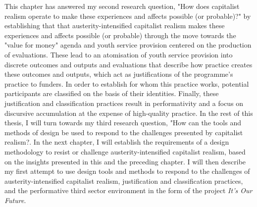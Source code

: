 This chapter has answered my second research question, "How does capitalist realism operate to make these experiences and affects possible (or probable)?" by establishing that that austerity-intensified capitalist realism makes these experiences and affects possible (or probable) through the move towards the "value for money" agenda and youth service provision centered on the production of evaluations. These lead to an atomisation of youth service provision into discrete outcomes and outputs and evaluations that describe how practice creates these outcomes and outputs, which act as justifications of the programme's practice to funders. In order to establish for whom this practice works, potential participants are classified on the basis of their identities. Finally, these justification and classification practices result in performativity and a focus on discursive accumulation at the expense of high-quality practice. In the rest of this thesis, I will turn towards my third research question, "How can the tools and methods of design be used to respond to the challenges presented by capitalist realism?. In the next chapter, I will establish the requirements of a design methodology to resist or challenge austerity-intensified capitalist realism, based on the insights presented in this and the preceding chapter. I will then describe my first attempt to use design tools and methods to respond to the challenges of austerity-intensified capitalist realism, justification and classification practices, and the performative third sector environment in the form of the project \textit{It's Our Future}. 


